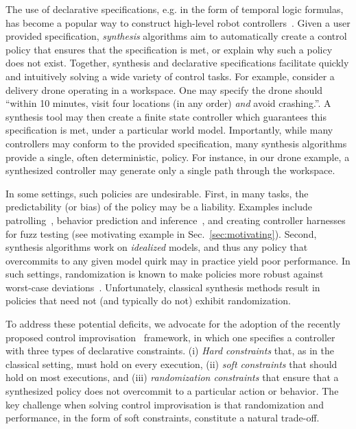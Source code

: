 The use of declarative specifications, e.g. in the form of temporal logic formulas, has become a popular way to construct high-level robot controllers~\cite{DBLP:conf/iros/HorowitzWM14, DBLP:conf/rss/WongEK14, DBLP:conf/iros/HeLKV17, DBLP:conf/icra/FuATP16, DBLP:conf/icra/HeWKV19, DBLP:journals/arobots/MoarrefK20, DBLP:conf/icra/KantarosM0P20}.
Given a user provided specification, \emph{synthesis} algorithms aim
to automatically create a control policy that ensures that the
specification is met, or explain why such a policy does not
exist. Together, synthesis and declarative specifications facilitate
quickly and intuitively solving a wide variety of control tasks.  For
example, consider a delivery drone operating in a workspace. One may
specify the drone should ``within 10 minutes, visit four locations (in any
order) \emph{and} avoid crashing.''. A synthesis tool may then create a
finite state controller which guarantees this specification is met,
under a particular world model.
Importantly, while many controllers may conform to the
provided specification, many synthesis algorithms provide a
single, often deterministic, policy.  For instance, in our drone
example, a synthesized controller may generate only a single path
through the workspace.

In some settings, such policies are undesirable.  First, in
many tasks, the predictability (or bias) of the policy may be a
liability.  Examples include
patrolling~\cite{DBLP:journals/ior/AlpernMP11}, behavior prediction
and inference~\cite{DBLP:conf/cav/Vazquez-Chanlatte20}, and creating
controller harnesses for fuzz testing (see motivating
example in Sec.~\ref{sec:motivating}). Second, synthesis algorithms work on \emph{idealized}
models, and thus any policy that overcommits to any given model quirk
may in practice yield poor performance. In such settings,
randomization is known to make policies more robust against worst-case
deviations~\cite{mceThesis, maxEntAnswer}. Unfortunately, classical 
synthesis methods result in policies that need not (and typically do
not) exhibit randomization.

To address these potential deficits, we advocate for the adoption of
the recently proposed control
improvisation~\cite{DBLP:conf/cav/FremontS18,DBLP:conf/fsttcs/FremontDSW15}
framework, in which one specifies a controller with three types of
declarative constraints. (i) \emph{Hard constraints} that, as in the
classical setting, must hold on every execution, (ii) \emph{soft constraints} that should hold 
on most executions, and (iii) \emph{randomization
constraints} that ensure that a synthesized policy does not overcommit to a particular action or behavior. 
The key challenge when solving control improvisation is that randomization and performance, in the form of soft constraints, constitute a natural trade-off.

